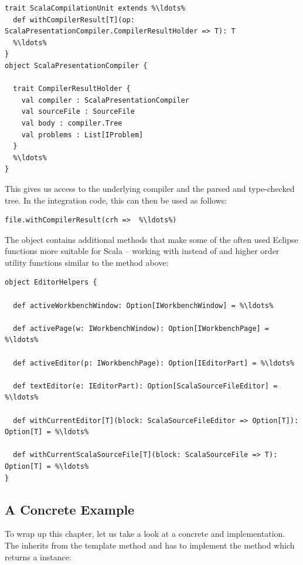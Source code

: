 \documentclass[10pt,a4paper,oneside]{scrreprt}
\begin{document}
\begin{lstlisting}
trait ScalaCompilationUnit extends %\ldots%
  def withCompilerResult[T](op: ScalaPresentationCompiler.CompilerResultHolder => T): T
  %\ldots%
}
object ScalaPresentationCompiler {
  
  trait CompilerResultHolder {
    val compiler : ScalaPresentationCompiler
    val sourceFile : SourceFile
    val body : compiler.Tree
    val problems : List[IProblem]
  }
  %\ldots%
}
\end{lstlisting}

This gives us access to the underlying compiler and the parsed and type-checked tree. In the integration code, this can then be used as follows:

\begin{lstlisting}
file.withCompilerResult(crh =>  %\ldots%)
\end{lstlisting}

The  object contains additional methods that make some of the often used Eclipse functions more suitable for Scala -- working with  instead of  and higher order utility functions similar to the  method above:

\begin{lstlisting}
object EditorHelpers {

  def activeWorkbenchWindow: Option[IWorkbenchWindow] = %\ldots%

  def activePage(w: IWorkbenchWindow): Option[IWorkbenchPage] = %\ldots%

  def activeEditor(p: IWorkbenchPage): Option[IEditorPart] = %\ldots%

  def textEditor(e: IEditorPart): Option[ScalaSourceFileEditor] = %\ldots%

  def withCurrentEditor[T](block: ScalaSourceFileEditor => Option[T]): Option[T] = %\ldots%

  def withCurrentScalaSourceFile[T](block: ScalaSourceFile => T): Option[T] = %\ldots%
}
\end{lstlisting}

\subsection{A Concrete Example}

To wrap up this chapter, let us take a look at a  concrete  and  implementation. The  inherits from the  template method and has to implement the  method which returns a  instance:
\end{document}
